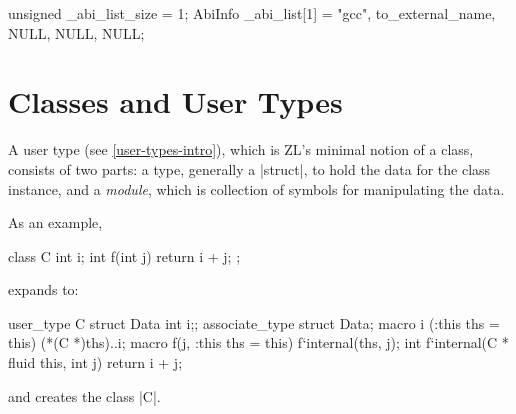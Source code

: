 \begin{code}
unsigned _abi_list_size = 1;
AbiInfo _abi_list[1] = {{"gcc", to_external_name, NULL, NULL, NULL}};
\end{code}





\chapter{Classes and User Types}
\label{class-user-type}


A user type (see \ref{user-types-intro}), which is ZL's minimal
notion of a class, consists of two parts: a type, generally a
|struct|, to hold the data for the class instance, and a
\textit{module}, which is collection of symbols for manipulating the
data.  


As an example,
\begin{code}
class C { int i; 
          int f(int j) {return i + j;} };
\end{code}
expands to:
\begin{code}
user_type C {
  struct Data {int i;};
  associate_type struct Data;
  macro i (:this ths = this) {(*(C *)ths)..i;}
  macro f(j, :this ths = this) {f`internal(ths, j);}
  int f`internal(C * fluid this, int j) {return i + j;}
}
\end{code}
and creates the class |C|.

